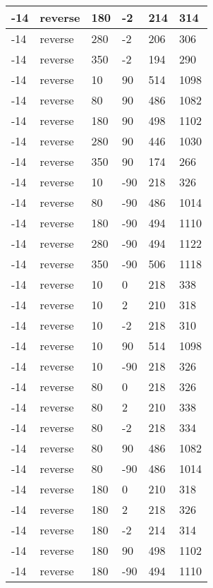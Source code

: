 \begin{table}
\begin{center}
\begin{tabular}{|l|l|l|l|l|l|}
			\hline
			-14 & reverse & 180 & -2 & 214 & 314 \\
			\hline
			-14 & reverse & 280 & -2 & 206 & 306 \\
			\hline
			-14 & reverse & 350 & -2 & 194 & 290 \\
			\hline
			-14 & reverse & 10 & 90 & 514 & 1098 \\
			\hline
			-14 & reverse & 80 & 90 & 486 & 1082 \\
			\hline
			-14 & reverse & 180 & 90 & 498 & 1102 \\
			\hline
			-14 & reverse & 280 & 90 & 446 & 1030 \\
			\hline
			-14 & reverse & 350 & 90 & 174 & 266 \\
			\hline
			-14 & reverse & 10 & -90 & 218 & 326 \\
			\hline
			-14 & reverse & 80 & -90 & 486 & 1014 \\
			\hline
			-14 & reverse & 180 & -90 & 494 & 1110 \\
			\hline
			-14 & reverse & 280 & -90 & 494 & 1122 \\
			\hline
			-14 & reverse & 350 & -90 & 506 & 1118 \\
			\hline
			-14 & reverse & 10 & 0 & 218 & 338 \\
			\hline
			-14 & reverse & 10 & 2 & 210 & 318 \\
			\hline
			-14 & reverse & 10 & -2 & 218 & 310 \\
			\hline
			-14 & reverse & 10 & 90 & 514 & 1098 \\
			\hline
			-14 & reverse & 10 & -90 & 218 & 326 \\
			\hline
			-14 & reverse & 80 & 0 & 218 & 326 \\
			\hline
			-14 & reverse & 80 & 2 & 210 & 338 \\
			\hline
			-14 & reverse & 80 & -2 & 218 & 334 \\
			\hline
			-14 & reverse & 80 & 90 & 486 & 1082 \\
			\hline
			-14 & reverse & 80 & -90 & 486 & 1014 \\
			\hline
			-14 & reverse & 180 & 0 & 210 & 318 \\
			\hline
			-14 & reverse & 180 & 2 & 218 & 326 \\
			\hline
			-14 & reverse & 180 & -2 & 214 & 314 \\
			\hline
			-14 & reverse & 180 & 90 & 498 & 1102 \\
			\hline
			-14 & reverse & 180 & -90 & 494 & 1110 \\

\end{tabular}
\end{center}
\end{table}
